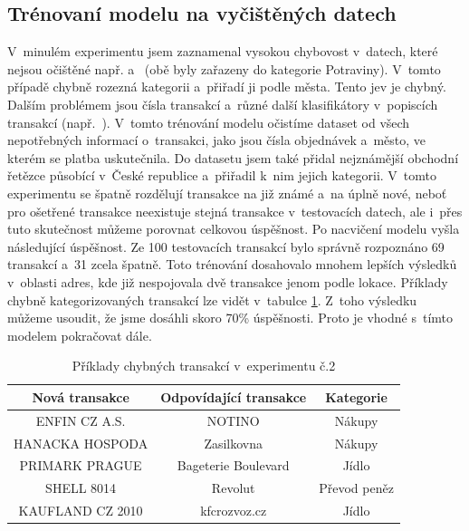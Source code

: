 \subsection{Trénovaní modelu na vyčištěných datech}
V~minulém experimentu jsem zaznamenal vysokou chybovost v~datech, které nejsou očištěné např.  a~ (obě byly zařazeny do kategorie Potraviny). V~tomto případě chybně rozezná kategorii a~přiřadí ji podle města. Tento jev je chybný. Dalším problémem jsou čísla transakcí a~různé další klasifikátory v~popiscích transakcí (např.~). V~tomto trénování modelu očistíme dataset od všech nepotřebných informací o~transakci, jako jsou čísla objednávek a~město, ve kterém se platba uskutečnila. Do datasetu jsem také přidal nejznámější obchodní řetězce působící v~České republice a~přiřadil k~nim jejich kategorii. V~tomto experimentu se špatně rozdělují transakce na již známé a~na úplně nové, neboť pro ošetřené transakce neexistuje stejná transakce v~testovacích datech, ale i~přes tuto skutečnost můžeme porovnat celkovou úspěšnost. 
Po nacvičení modelu vyšla následující úspěšnost. Ze 100 testovacích transakcí bylo správně rozpoznáno 69 transakcí a~31 zcela špatně. Toto trénování dosahovalo mnohem lepších výsledků v~oblasti adres, kde již nespojovala dvě transakce jenom podle lokace. 
Příklady chybně kategorizovaných transakcí lze vidět v~tabulce \ref{tab:exp2}.
Z~toho výsledku můžeme usoudit, že jsme dosáhli skoro 70\% úspěšnosti. Proto je vhodné s~tímto modelem pokračovat dále.

\begin{center}
\begin{table}[h]
\centering
\begin{tabular}{ |c| c| c| }
\hline
\textbf{Nová transakce} & \textbf{Odpovídající transakce}  & \textbf{Kategorie} \\  
\hline
ENFIN CZ A.S. & NOTINO & Nákupy \\ 
\hline
HANACKA HOSPODA  & Zasilkovna & Nákupy  \\ 
\hline
PRIMARK PRAGUE & Bageterie Boulevard  & Jídlo  \\  
\hline
SHELL 8014  & Revolut & Převod peněz  \\
\hline
KAUFLAND CZ  2010 & kfcrozvoz.cz & Jídlo  \\
\hline
\end{tabular}
\caption{Příklady chybných transakcí v~experimentu č.2}
\label{tab:exp2}
\end{table}
\end{center}

